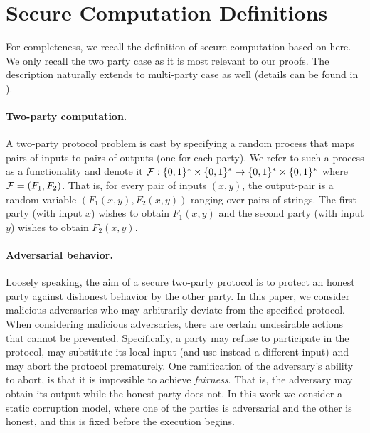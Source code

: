 

\section{Secure Computation Definitions}
\label{sec:mpc}

For completeness, we recall the definition of secure computation based on \cite[Chapter 7]{Goldreich04} here. We only recall the two party case as it is most relevant to our proofs. The description naturally extends to multi-party case as well (details can be found in \cite{Goldreich04}).


\paragraph{Two-party computation.} A two-party protocol problem is cast by specifying a random process
that maps pairs of inputs to pairs of outputs (one for each party). We refer to such a process as
a functionality and denote it $\mathbf{\mathcal{F}} : \{0,1\}^* \times \{0,1\}^*\rightarrow\{0,1\}^* \times \{0,1\}^*$ where $\mathbf{\mathcal{F}} = (F_1, F_2)$. That is,
for every pair of inputs $(x, y)$, the output-pair is a random variable $(F_1(x, y), F_2(x, y))$ ranging over
pairs of strings. The first party (with input $x$) wishes to obtain $F_1(x, y)$ and the second party (with
input $y$) wishes to obtain $F_2(x, y)$.


\paragraph{Adversarial behavior.} Loosely speaking, the aim of a secure two-party protocol is to protect
an honest party against dishonest behavior by the other party. In this paper, we consider malicious
adversaries who may arbitrarily deviate from the specified protocol. When considering malicious
adversaries, there are certain undesirable actions that cannot be prevented. Specifically, a party
may refuse to participate in the protocol, may substitute its local input (and use instead a different
input) and may abort the protocol prematurely. One ramification of the adversary's ability to
abort, is that it is impossible to achieve {\em fairness}. That is, the adversary may obtain its output
while the honest party does not. In this work we consider a static corruption model, where one of the parties is adversarial and the other is honest, and this is fixed before the execution begins.


